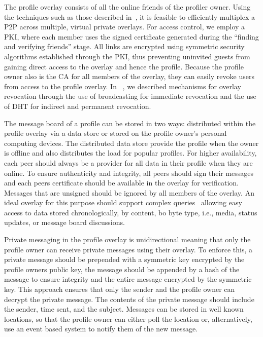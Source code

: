 \documentclass[letterpaper,twocolumn,10pt]{article}
\begin{document}
The profile overlay consists of all the online friends of the profiler owner.
Using the techniques such as those described in~\cite{icdcs10}, it is feasible
to efficiently multiplex a P2P across multiple, virtual private overlays.
For access control, we employ a PKI, where each member uses the signed certificate
generated during the ``finding and verifying friends'' stage.  All links are
encrypted using symmetric security algorithms established through the PKI,
thus preventing uninvited guests from gaining direct access to the overlay and
hence the profile.  Because the profile owner also is the CA for all members of
the overlay, they can easily revoke users from access to the profile overlay.
In ~\cite{icdcs10}, we described mechanisms for overlay revocation through the
use of broadcasting for immediate revocation and the use of DHT for indirect
and permanent revocation.

The message board of a profile can be stored in two ways: distributed within the
profile overlay via a data store or stored on the profile owner's personal
computing devices.  The distributed data store provide the profile when the
owner is offline and also distributes the load for popular profiles.  For
higher availability, each peer should always be a provider for all data in their
profile when they are online.  To ensure authenticity and integrity, all peers
should sign their messages and each peers certificate should be available in
the overlay for verification.  Messages that are unsigned should be ignored
by all members of the overlay.  An ideal overlay for this purpose should
support complex queries~\cite{complex_queries} allowing easy access to data
stored chronologically, by content, bo byte type, i.e., media, status updates,
or message board discussions.

Private messaging in the profile overlay is unidirectional meaning that only
the profile owner can receive private messages using their overlay.  To
enforce this, a private message should be prepended with a symmetric key
encrypted by the profile owners public key, the message should be appended
by a hash of the message to ensure integrity and the entire message encrypted
by the symmetric key.  This approach ensures that only the sender and the
profile owner can decrypt the private message.  The contents of the private
message should include the sender, time sent, and the subject.  Messages can
be stored in well known locations, so that the profile owner can either poll
the location or, alternatively, use an event based system to notify them of
the new message.
\end{document}
